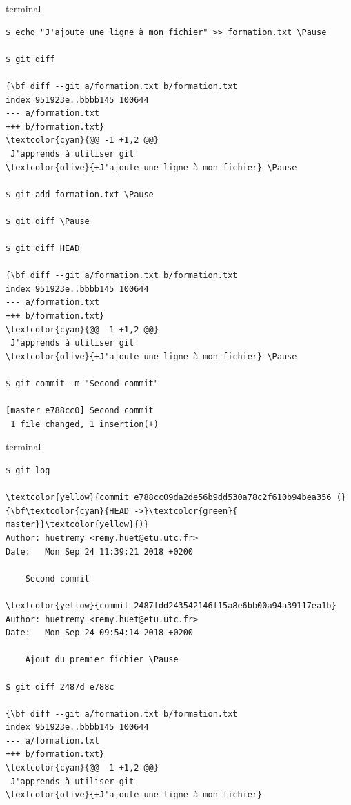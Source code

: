 \documentclass[usepdftitle=false]{beamer}
\newcommand{\Pause}{%
\ifdef{\Release}
  {\pause}
  {}
}
\begin{document}
\begin{frame}[fragile]
	\begin{beamercolorbox}[rounded=true,shadow=true]{terminal}
		\begin{Verbatim}
$ echo "J'ajoute une ligne à mon fichier" >> formation.txt \Pause

$ git diff

{\bf diff --git a/formation.txt b/formation.txt
index 951923e..bbbb145 100644
--- a/formation.txt
+++ b/formation.txt}
\textcolor{cyan}{@@ -1 +1,2 @@}
 J'apprends à utiliser git
\textcolor{olive}{+J'ajoute une ligne à mon fichier} \Pause

$ git add formation.txt \Pause

$ git diff \Pause

$ git diff HEAD

{\bf diff --git a/formation.txt b/formation.txt
index 951923e..bbbb145 100644
--- a/formation.txt
+++ b/formation.txt}
\textcolor{cyan}{@@ -1 +1,2 @@}
 J'apprends à utiliser git
\textcolor{olive}{+J'ajoute une ligne à mon fichier} \Pause

$ git commit -m "Second commit"

[master e788cc0] Second commit
 1 file changed, 1 insertion(+)

\end{Verbatim}
	\end{beamercolorbox}
\end{frame}

\begin{frame}[fragile]
	\begin{beamercolorbox}[rounded=true,shadow=true]{terminal}
		\begin{Verbatim}
$ git log

\textcolor{yellow}{commit e788cc09da2de56b9dd530a78c2f610b94bea356 (}{\bf\textcolor{cyan}{HEAD ->}\textcolor{green}{ master}}\textcolor{yellow}{)}
Author: huetremy <remy.huet@etu.utc.fr>
Date:   Mon Sep 24 11:39:21 2018 +0200

    Second commit

\textcolor{yellow}{commit 2487fdd243542146f15a8e6bb00a94a39117ea1b}
Author: huetremy <remy.huet@etu.utc.fr>
Date:   Mon Sep 24 09:54:14 2018 +0200

    Ajout du premier fichier \Pause

$ git diff 2487d e788c

{\bf diff --git a/formation.txt b/formation.txt
index 951923e..bbbb145 100644
--- a/formation.txt
+++ b/formation.txt}
\textcolor{cyan}{@@ -1 +1,2 @@}
 J'apprends à utiliser git
\textcolor{olive}{+J'ajoute une ligne à mon fichier}
    		
		\end{Verbatim}
	\end{beamercolorbox}
\end{frame}
\end{document}
